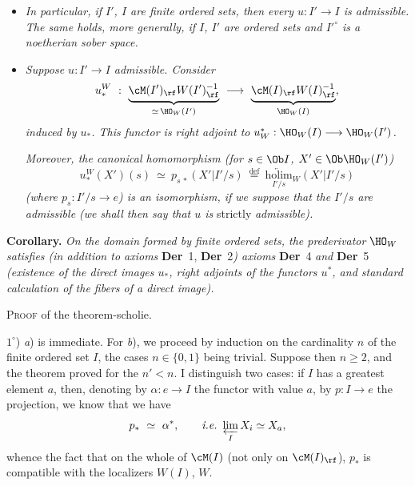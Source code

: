 
\begin{itemize}[leftmargin=3em]
\item[c)] \textit{In particular, if $I'$, $I$ are finite ordered sets, then every $u : I' \longrightarrow I$ is admissible. The same holds, more generally, if $I$, $I'$ are ordered sets and $I'^{\circ}$ is a noetherian sober space.}
\end{itemize}

\begin{itemize}[leftmargin=2em]
\item[2)] \textit{Suppose $u : I' \longrightarrow I$ admissible. Consider}
\[
u_*^W \ : \ \underbrace{\cM(I')_{\rf}W(I')_{\rf}^{-1}}_{\simeq\, \HO_W(I')} \ \longrightarrow \ \underbrace{\cM(I)_{\rf}W(I)_{\rf}^{-1}}_{\HO_W(I)},
\]
\textit{induced by $u_*$. This functor is right adjoint to $u_W^* : \HO_W(I) \longrightarrow \HO_W(I')$.}

\textit{Moreover, the canonical homomorphism (for $s \in \Ob I$, $X' \in \Ob \HO_W(I')$)}
\[
u_*^W(X')(s) \ \simeq \ p_{s\,*}(X'|I'/s) \ \overset{\text{def}}{=} \ \underset{I'/s}{\underleftarrow{\mathrm{holim}}}{}_W(X'|I'/s)
\]
\textit{(where $p_s : I'/s \longrightarrow e$) is an isomorphism, if we suppose that the $I'/s$ are admissible (we shall then say that $u$ is} strictly \textit{admissible).}
\end{itemize}

\textbf{Corollary.} \textit{On the domain formed by finite ordered sets, the prederivator} $\HO_W$ \textit{satisfies (in addition to axioms} \textbf{Der}~1, \textbf{Der}~2\textit{) axioms} \textbf{Der}~4 \textit{and} \textbf{Der}~5 \textit{(existence of the direct images $u_*$, right adjoints of the functors $u^*$, and standard calculation of the fibers of a direct image).}

\textsc{Proof} of the theorem-scholie.

$1^\circ$) \textit{a}) is immediate. For \textit{b}), we proceed by induction on the cardinality $n$ of the finite ordered set $I$, the cases $n \in \{0,1\}$ being trivial. Suppose then $n \geq 2$, and the theorem proved for the $n' < n$. I distinguish two cases: if $I$ has a greatest element $a$, then, denoting by $\alpha : e \longrightarrow I$ the functor with value $a$, by $p : I \longrightarrow e$ the projection, we know that we have
\[
p_* \ \simeq \ \alpha^*, \qquad \textit{i.e.} \ \varprojlim_{I} X_i \simeq X_a,
\]
whence the fact that on the whole of $\cM(I)$
(not only on $\cM(I)_{\rf}$), $p_*$ is compatible with the localizers $W(I)$, $W$.

